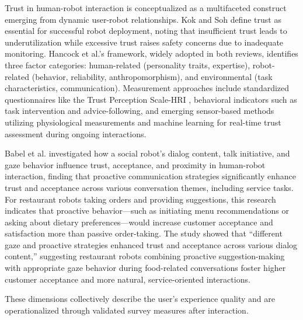 \documentclass[conference]{IEEEtran}
\begin{document}
Trust in human-robot interaction is conceptualized as a multifaceted construct emerging from dynamic user-robot relationships. Kok and Soh \cite{b18} define trust as essential for successful robot deployment, noting that insufficient trust leads to underutilization while excessive trust raises safety concerns due to inadequate monitoring. Hancock et al.'s \cite{b6} framework, widely adopted in both reviews, identifies three factor categories: human-related (personality traits, expertise), robot-related (behavior, reliability, anthropomorphism), and environmental (task characteristics, communication). Measurement approaches include standardized questionnaires like the Trust Perception Scale-HRI \cite{b20}, behavioral indicators such as task intervention and advice-following, and emerging sensor-based methods utilizing physiological measurements and machine learning for real-time trust assessment during ongoing interactions.

Babel et al. \cite{b21} investigated how a social robot's dialog content, talk initiative, and gaze behavior influence trust, acceptance, and proximity in human-robot interaction, finding that proactive communication strategies significantly enhance trust and acceptance across various conversation themes, including service tasks. For restaurant robots taking orders and providing suggestions, this research indicates that proactive behavior—such as initiating menu recommendations or asking about dietary preferences—would increase customer acceptance and satisfaction more than passive order-taking. The study showed that ``different gaze and proactive strategies enhanced trust and acceptance across various dialog content,'' suggesting restaurant robots combining proactive suggestion-making with appropriate gaze behavior during food-related conversations foster higher customer acceptance and more natural, service-oriented interactions.

These dimensions collectively describe the user's experience quality and are operationalized through validated survey measures after interaction.
\end{document}

